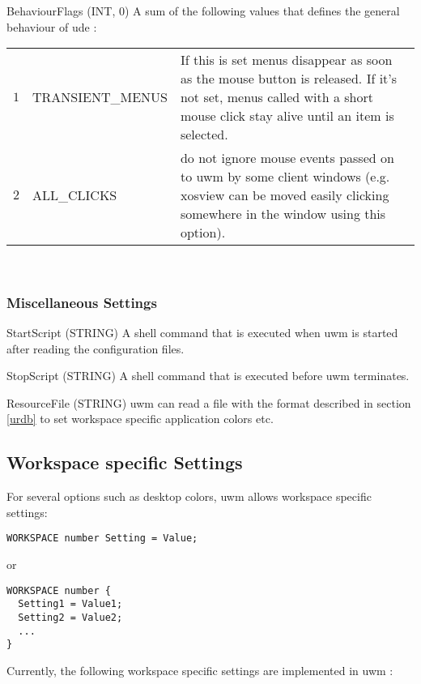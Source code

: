 \documentclass[10pt,a4paper]{article}
\newcommand{\uwm}{{\sc uwm} }
\newcommand{\ude}{{\sc ude} }
\newenvironment{ttdesc}[1]{
   \begin{list}{}{
          \renewcommand{\makelabel}[1]{\texttt{##1\hfill}}}}{\end{list}}
\begin{document}
\begin{ttdesc}{description}
\item[BehaviourFlags (INT, 0)] A sum of the following values that defines the
general behaviour of \ude:\\[\smallskipamount]
\begin{tabular}{rlp{7cm}}
$1$  & TRANSIENT\_MENUS & If this is set menus disappear as soon as the mouse
button is released. If it's not set, menus called with a short mouse click
stay alive until an item is selected.\\
$2$  & ALL\_CLICKS & do not ignore mouse events passed on to uwm by some
client windows (e.g. xosview can be moved easily clicking somewhere in the
window using this option).\\
\end{tabular}\\
\end{ttdesc}

\subsubsection{Miscellaneous Settings}
\begin{ttdesc}{description}
\item[StartScript (STRING)] A shell command that is executed when \uwm is
started after reading the configuration files.
\item[StopScript (STRING)] A shell command that is executed before \uwm
terminates.
\item[ResourceFile (STRING)] \uwm can read a file with the format described in
section \ref{urdb} to set workspace specific application colors etc.
\end{ttdesc}

\subsection{Workspace specific Settings}
For several options such as desktop colors, uwm allows workspace specific
settings:

\begin{verbatim}
WORKSPACE number Setting = Value;
\end{verbatim}

or

\begin{verbatim}
WORKSPACE number {
  Setting1 = Value1;
  Setting2 = Value2;
  ...
}
\end{verbatim}

Currently, the following workspace specific settings are implemented in \uwm:
\end{document}
